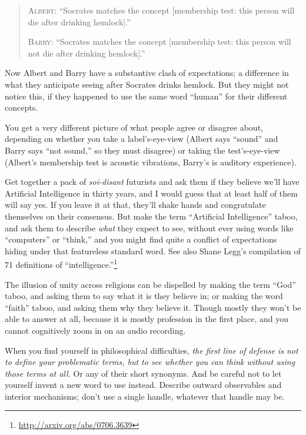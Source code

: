 \begin{quotation}
{
 \textsc{Albert}: ``Socrates matches the concept
[membership test: this person will die after drinking
hemlock].''}

{
 \textsc{Barry}: ``Socrates matches the concept [membership
test: this person will not die after drinking
hemlock].''}
\end{quotation}

{
 Now Albert and Barry have a substantive clash of expectations; a
difference in what they anticipate seeing after Socrates drinks
hemlock. But they might not notice this, if they happened to use the
same word ``human'' for their
different concepts.}

{
 You get a very different picture of what people agree or disagree
about, depending on whether you take a label's-eye-view
(Albert says ``sound'' and Barry
says ``not sound,'' so they must
disagree) or taking the test's-eye-view
(Albert's membership test is acoustic vibrations,
Barry's is auditory experience).}

{
 Get together a pack of \textit{soi-disant} futurists and ask them
if they believe we'll have Artificial Intelligence in
thirty years, and I would guess that at least half of them will say
yes. If you leave it at that, they'll shake hands and
congratulate themselves on their consensus. But make the term
``Artificial Intelligence'' taboo,
and ask them to describe \textit{what} they expect to see, without ever
using words like ``computers'' or
``think,'' and you might find quite
a conflict of expectations hiding under that featureless standard word.
See also Shane Legg's compilation of 71 definitions of
``intelligence.''\footnote{\url{http://arxiv.org/abs/0706.3639}}}

{
 The illusion of unity across religions can be dispelled by making
the term ``God'' taboo, and asking
them to say what it is they believe in; or making the word
``faith'' taboo, and asking them why
they believe it. Though mostly they won't be able to
answer at all, because it is mostly profession in the first place, and
you cannot cognitively zoom in on an audio recording.}

{
 When you find yourself in philosophical difficulties, \textit{the
first line of defense is not to define your problematic terms, but to
see whether you can think without using those terms at all.} Or any of
their short synonyms. And be careful not to let yourself invent a new
word to use instead. Describe outward observables and interior
mechanisms; don't use a single handle, whatever that
handle may be.}

